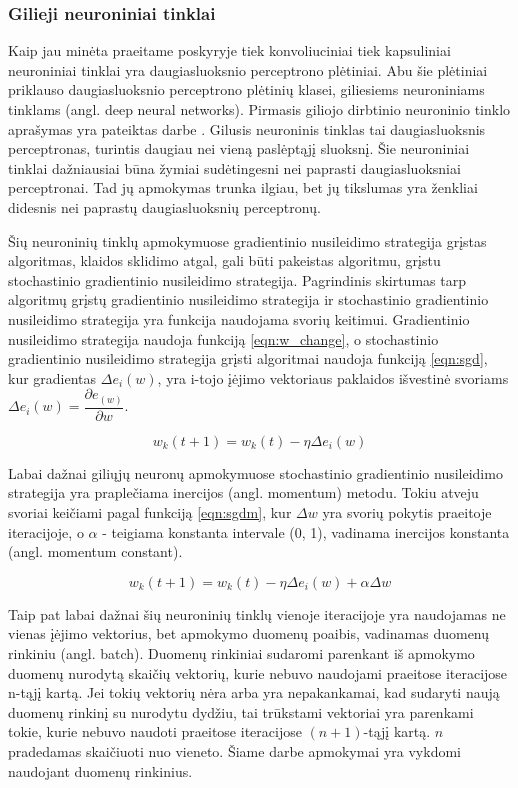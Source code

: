 \subsubsection{Gilieji neuroniniai tinklai}

Kaip jau minėta praeitame poskyryje tiek konvoliuciniai tiek kapsuliniai neuroniniai tinklai yra daugiasluoksnio perceptrono plėtiniai. Abu šie plėtiniai priklauso daugiasluoksnio perceptrono plėtinių klasei, giliesiems neuroniniams tinklams (angl. deep neural networks). Pirmasis giliojo dirbtinio neuroninio tinklo aprašymas yra pateiktas darbe \cite{deepNN}. Gilusis neuroninis tinklas tai daugiasluoksnis perceptronas, turintis daugiau nei vieną paslėptąjį sluoksnį. Šie neuroniniai tinklai dažniausiai būna žymiai sudėtingesni nei paprasti daugiasluoksniai perceptronai. Tad jų apmokymas trunka ilgiau, bet jų tikslumas yra ženkliai didesnis nei paprastų daugiasluoksnių perceptronų.

Šių neuroninių tinklų apmokymuose gradientinio nusileidimo strategija grįstas algoritmas, klaidos sklidimo atgal, gali būti pakeistas algoritmu, grįstu stochastinio gradientinio nusileidimo strategija. Pagrindinis skirtumas tarp algoritmų grįstų gradientinio nusileidimo strategija ir stochastinio gradientinio nusileidimo strategija yra funkcija naudojama svorių keitimui. Gradientinio nusileidimo strategija naudoja funkciją \ref{eqn:w_change}, o stochastinio gradientinio nusileidimo strategija grįsti algoritmai naudoja funkciją \ref{eqn:sgd}, kur gradientas $\Delta e_i(w)$, yra i-tojo įėjimo vektoriaus paklaidos išvestinė svoriams $\Delta e_i(w) = \dfrac{\partial e_(w)}{\partial w}$.

\begin{equation}
\label{eqn:sgd}
	w_k(t + 1) = w_k(t) - \eta \Delta e_i(w)
\end{equation}



Labai dažnai giliųjų neuronų apmokymuose stochastinio gradientinio nusileidimo strategija yra praplečiama inercijos (angl. momentum) metodu. Tokiu atveju svoriai keičiami pagal funkciją \ref{eqn:sgdm}, kur $\Delta w$ yra svorių pokytis praeitoje iteracijoje, o $\alpha$ - teigiama konstanta intervale (0, 1), vadinama inercijos konstanta (angl. momentum constant).

\begin{equation}
\label{eqn:sgdm}
	w_k(t + 1) = w_k(t) - \eta \Delta e_i(w) + \alpha \Delta w
\end{equation}

Taip pat labai dažnai šių neuroninių tinklų vienoje iteracijoje yra naudojamas ne vienas įėjimo vektorius, bet apmokymo duomenų poaibis, vadinamas duomenų rinkiniu (angl. batch). Duomenų rinkiniai sudaromi parenkant iš apmokymo duomenų nurodytą skaičių vektorių, kurie nebuvo naudojami praeitose iteracijose n-tąjį kartą. Jei tokių vektorių nėra arba yra nepakankamai, kad sudaryti naują duomenų rinkinį su nurodytu dydžiu, tai trūkstami vektoriai yra parenkami tokie, kurie nebuvo naudoti praeitose iteracijose $(n + 1)$-tąjį kartą. $n$ pradedamas skaičiuoti nuo vieneto. Šiame darbe apmokymai yra vykdomi naudojant duomenų rinkinius.

